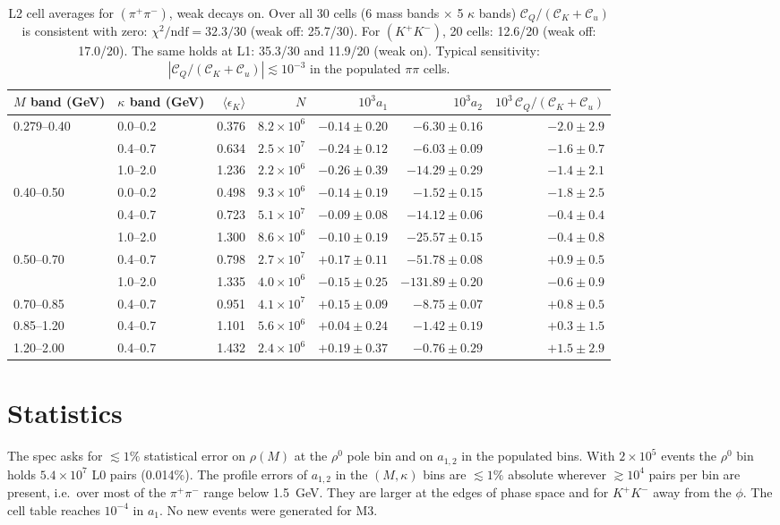 \documentclass[11pt,a4paper]{article}
\newcommand{\CK}{\mathcal C_K}
\newcommand{\Cu}{\mathcal C_u}
\newcommand{\CQ}{\mathcal C_Q}
\begin{document}
\begin{table}[H]
\centering\footnotesize
\begin{tabular}{llrrrrr}
\toprule
$M$ band (GeV) & $\kappa$ band (GeV) & $\langle\epsilon_K\rangle$ & $N$ & $10^3a_1$ & $10^3a_2$ & $10^3\,\CQ/(\CK+\Cu)$ \\
\midrule
0.279--0.40 & 0.0--0.2 & 0.376 & $8.2\times10^6$ & $-0.14\pm0.20$ & $-6.30\pm0.16$ & $-2.0\pm2.9$ \\
            & 0.4--0.7 & 0.634 & $2.5\times10^7$ & $-0.24\pm0.12$ & $-6.03\pm0.09$ & $-1.6\pm0.7$ \\
            & 1.0--2.0 & 1.236 & $2.2\times10^6$ & $-0.26\pm0.39$ & $-14.29\pm0.29$ & $-1.4\pm2.1$ \\
0.40--0.50  & 0.0--0.2 & 0.498 & $9.3\times10^6$ & $-0.14\pm0.19$ & $-1.52\pm0.15$ & $-1.8\pm2.5$ \\
            & 0.4--0.7 & 0.723 & $5.1\times10^7$ & $-0.09\pm0.08$ & $-14.12\pm0.06$ & $-0.4\pm0.4$ \\
            & 1.0--2.0 & 1.300 & $8.6\times10^6$ & $-0.10\pm0.19$ & $-25.57\pm0.15$ & $-0.4\pm0.8$ \\
0.50--0.70  & 0.4--0.7 & 0.798 & $2.7\times10^7$ & $+0.17\pm0.11$ & $-51.78\pm0.08$ & $+0.9\pm0.5$ \\
            & 1.0--2.0 & 1.335 & $4.0\times10^6$ & $-0.15\pm0.25$ & $-131.89\pm0.20$ & $-0.6\pm0.9$ \\
0.70--0.85  & 0.4--0.7 & 0.951 & $4.1\times10^7$ & $+0.15\pm0.09$ & $-8.75\pm0.07$ & $+0.8\pm0.5$ \\
0.85--1.20  & 0.4--0.7 & 1.101 & $5.6\times10^6$ & $+0.04\pm0.24$ & $-1.42\pm0.19$ & $+0.3\pm1.5$ \\
1.20--2.00  & 0.4--0.7 & 1.432 & $2.4\times10^6$ & $+0.19\pm0.37$ & $-0.76\pm0.29$ & $+1.5\pm2.9$ \\
\bottomrule
\end{tabular}
\caption{L2 cell averages for $(\pi^+\pi^-)$, weak decays on. Over all 30 cells (6 mass bands
$\times$ 5 $\kappa$ bands) $\CQ/(\CK+\Cu)$ is consistent with zero: $\chi^2/\text{ndf}=32.3/30$
(weak off: 25.7/30). For $(K^+K^-)$, 20 cells: 12.6/20 (weak off: 17.0/20). The same holds at L1:
35.3/30 and 11.9/20 (weak on). Typical sensitivity: $|\CQ/(\CK+\Cu)|\lesssim10^{-3}$ in the
populated $\pi\pi$ cells.}
\label{tab:cells}
\end{table}

\section{Statistics}
The spec asks for $\lesssim1\%$ statistical error on $\rho(M)$ at the $\rho^0$ pole bin and on
$a_{1,2}$ in the populated bins. With $2\times10^5$ events the $\rho^0$ bin holds $5.4\times10^7$
L0 pairs (0.014\%). The profile errors of $a_{1,2}$ in the $(M,\kappa)$ bins are $\lesssim1\%$
absolute wherever $\gtrsim10^4$ pairs per bin are present, i.e.\ over most of the $\pi^+\pi^-$ range
below 1.5~GeV. They are larger at the edges of phase space and for $K^+K^-$ away from the $\phi$.
The cell table reaches $10^{-4}$ in $a_1$. No new events were generated for M3.
\end{document}

